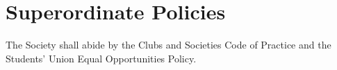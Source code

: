 \section{Superordinate Policies}
\begin{clause}
The Society shall abide by the Clubs and Societies Code of Practice and the Students' Union Equal Opportunities Policy.
\end{clause}